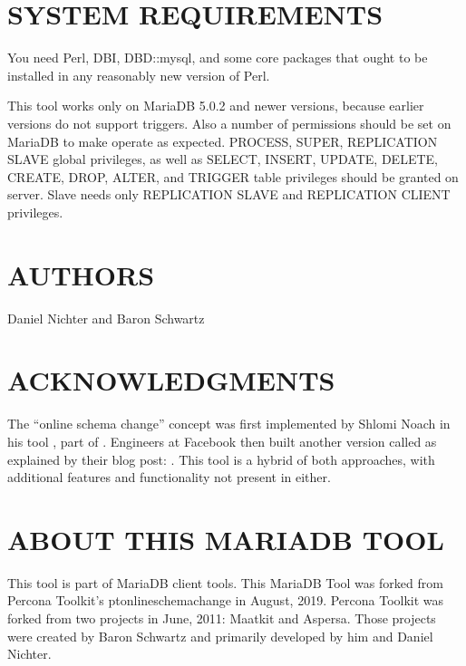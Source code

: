 \documentclass[letterpaper,10pt,english]{sphinxmanual}
\begin{document}
\section{SYSTEM REQUIREMENTS}
\label{\detokenize{mariadb-schema-change:system-requirements}}
\sphinxAtStartPar
You need Perl, DBI, DBD::mysql, and some core packages that ought to be
installed in any reasonably new version of Perl.

\sphinxAtStartPar
This tool works only on MariaDB 5.0.2 and newer versions, because earlier versions
do not support triggers. Also a number of permissions should be set on MariaDB
to make  operate as expected. PROCESS, SUPER, REPLICATION SLAVE
global privileges, as well as SELECT, INSERT, UPDATE, DELETE, CREATE, DROP, ALTER,
and TRIGGER table privileges should be granted on server. Slave needs only
REPLICATION SLAVE and REPLICATION CLIENT privileges.


\section{AUTHORS}
\label{\detokenize{mariadb-schema-change:authors}}
\sphinxAtStartPar
Daniel Nichter and Baron Schwartz


\section{ACKNOWLEDGMENTS}
\label{\detokenize{mariadb-schema-change:acknowledgments}}
\sphinxAtStartPar
The “online schema change” concept was first implemented by Shlomi Noach
in his tool , part of
.  Engineers at Facebook then built
another version called  as explained by their blog
post: . This tool is a hybrid of both approaches,
with additional features and functionality not present in either.


\section{ABOUT THIS MARIADB TOOL}
\label{\detokenize{mariadb-schema-change:about-this-mariadb-tool}}
\sphinxAtStartPar
This tool is part of MariaDB client tools. This MariaDB Tool was forked from
Percona Toolkit’s pt\sphinxhyphen{}online\sphinxhyphen{}schema\sphinxhyphen{}change in August, 2019. Percona Toolkit was
forked from two projects in June, 2011: Maatkit and Aspersa.  Those projects
were created by Baron Schwartz and primarily developed by him and Daniel Nichter.
\end{document}
